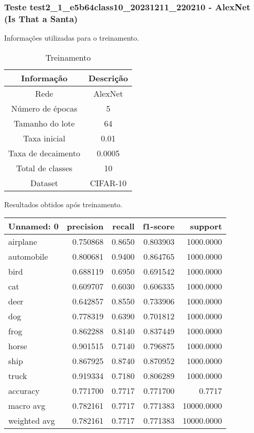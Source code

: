 \subsubsection{Teste test2_1_e5b64class10_20231211_220210 - AlexNet (Is That a Santa)}

Informações utilizadas para o treinamento.

\begin{table}[ht]
   \centering
   \caption{Treinamento}
   \label{tab:modelos}
   \begin{tabular}{| c | c | }
      \hline 
      \textbf{Informação} & \textbf{Descrição} \\
      \hline \hline 
      Rede & AlexNet \\
      \hline
      Número de épocas & 5\\
      \hline
      Tamanho do lote & 64\\
      \hline
      Taxa inicial & 0.01 \\
      \hline
      Taxa de decaimento & 0.0005 \\
      \hline
      Total de classes & 10\\
      \hline
      Dataset & CIFAR-10\\
      \hline
   \end{tabular} 
\end{table}

Resultados obtidos após treinamento.

\begin{tabular}{lrrrr}
\toprule
  Unnamed: 0 &  precision &  recall &  f1-score &    support \\
\midrule
    airplane &   0.750868 &  0.8650 &  0.803903 &  1000.0000 \\
  automobile &   0.800681 &  0.9400 &  0.864765 &  1000.0000 \\
        bird &   0.688119 &  0.6950 &  0.691542 &  1000.0000 \\
         cat &   0.609707 &  0.6030 &  0.606335 &  1000.0000 \\
        deer &   0.642857 &  0.8550 &  0.733906 &  1000.0000 \\
         dog &   0.778319 &  0.6390 &  0.701812 &  1000.0000 \\
        frog &   0.862288 &  0.8140 &  0.837449 &  1000.0000 \\
       horse &   0.901515 &  0.7140 &  0.796875 &  1000.0000 \\
        ship &   0.867925 &  0.8740 &  0.870952 &  1000.0000 \\
       truck &   0.919334 &  0.7180 &  0.806289 &  1000.0000 \\
    accuracy &   0.771700 &  0.7717 &  0.771700 &     0.7717 \\
   macro avg &   0.782161 &  0.7717 &  0.771383 & 10000.0000 \\
weighted avg &   0.782161 &  0.7717 &  0.771383 & 10000.0000 \\
\bottomrule
\end{tabular}


